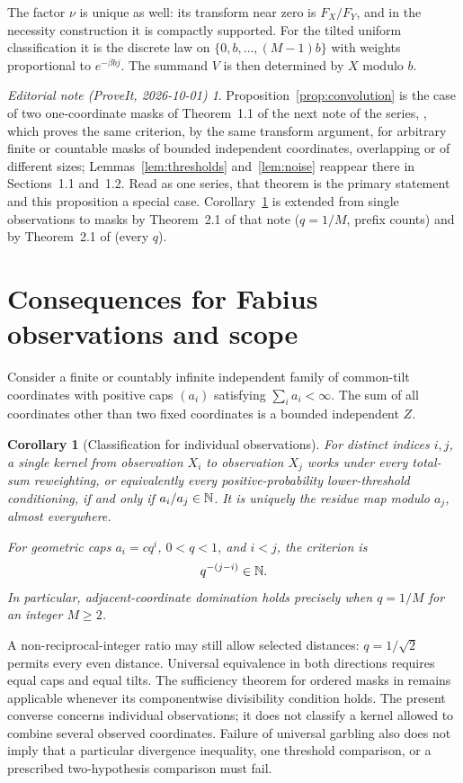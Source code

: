 \documentclass[11pt,a4paper]{article}
\newtheorem{corollary}[theorem]{Corollary}
\theoremstyle{remark}\newtheorem*{ednote}{Editorial note (ProveIt, 2026-10-01)}
\begin{document}
The factor $\nu$ is unique as well: its transform near zero is $F_X/F_Y$, and in the necessity construction it is compactly supported. For the tilted uniform classification it is the discrete law on $\{0,b,\ldots,(M-1)b\}$ with weights proportional to $e^{-\beta bj}$. The summand $V$ is then determined by $X$ modulo $b$.
\begin{ednote}
Proposition~\ref{prop:convolution} is the case of two one-coordinate masks of
Theorem~1.1 of the next note of the series,
, which proves the same criterion,
by the same transform argument, for arbitrary finite or countable masks of
bounded independent coordinates, overlapping or of different sizes;
Lemmas~\ref{lem:thresholds} and~\ref{lem:noise} reappear there in
Sections~1.1 and~1.2. Read as one series, that theorem is the primary
statement and this proposition a special case. Corollary~\ref{cor:fabius} is
extended from single observations to masks by Theorem~2.1 of that note
($q=1/M$, prefix counts) and by Theorem~2.1 of
 (every $q$).
\end{ednote}

\section{Consequences for Fabius observations and scope}
Consider a finite or countably infinite independent family of common-tilt coordinates with positive caps $(a_i)$ satisfying $\sum_i a_i<\infty$. The sum of all coordinates other than two fixed coordinates is a bounded independent $Z$.

\begin{corollary}[Classification for individual observations]\label{cor:fabius}
For distinct indices $i,j$, a single kernel from observation $X_i$ to observation $X_j$ works under every total-sum reweighting, or equivalently every positive-probability lower-threshold conditioning, if and only if $a_i/a_j\in\mathbb N$. It is uniquely the residue map modulo $a_j$, almost everywhere.

For geometric caps $a_i=cq^i$, $0<q<1$, and $i<j$, the criterion is
\[
 q^{-(j-i)}\in\mathbb N.
\]
In particular, adjacent-coordinate domination holds precisely when $q=1/M$ for an integer $M\ge2$.
\end{corollary}

A non-reciprocal-integer ratio may still allow selected distances: $q=1/\sqrt2$ permits every even distance. Universal equivalence in both directions requires equal caps and equal tilts. The sufficiency theorem for ordered masks in \cite{Modulo} remains applicable whenever its componentwise divisibility condition holds. The present converse concerns individual observations; it does not classify a kernel allowed to combine several observed coordinates. Failure of universal garbling also does not imply that a particular divergence inequality, one threshold comparison, or a prescribed two-hypothesis comparison must fail.
\end{document}
